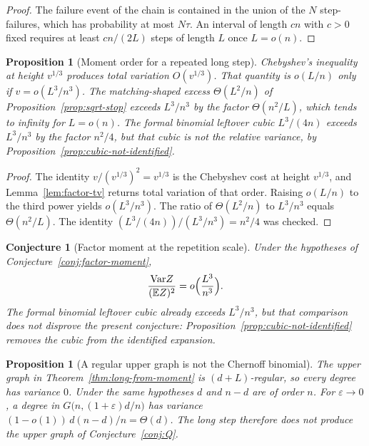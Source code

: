 \documentclass[11pt]{article}
\newtheorem{proposition}[theorem]{Proposition}
\newtheorem{conjecture}[theorem]{Conjecture}
\newcommand{\EE}{\mathbb{E}}
\newcommand{\Var}{\mathrm{Var}}
\begin{document}
\begin{proof}
The failure event of the chain is contained in the union of the \(N\) step-failures, which has probability at most \(N\tau\).
An interval of length \(cn\) with \(c>0\) fixed requires at least \(cn/(2L)\) steps of length \(L\) once \(L=o(n)\).
\end{proof}

\begin{proposition}[Moment order for a repeated long step]
\label{prop:chain-budget}
Chebyshev's inequality at height \(v^{1/3}\) produces total variation \(O(v^{1/3})\).
That quantity is \(o(L/n)\) only if \(v=o(L^3/n^3)\).
The matching-shaped excess \(\Theta(L^2/n)\) of Proposition~\ref{prop:sqrt-stop} exceeds \(L^3/n^3\) by the factor \(\Theta(n^2/L)\), which tends to infinity for \(L=o(n)\).
The formal binomial leftover cubic \(L^3/(4n)\) exceeds \(L^3/n^3\) by the factor \(n^2/4\), but that cubic is not the relative variance, by Proposition~\ref{prop:cubic-not-identified}.
\end{proposition}

\begin{proof}
The identity \(v/(v^{1/3})^2=v^{1/3}\) is the Chebyshev cost at height \(v^{1/3}\), and Lemma~\ref{lem:factor-tv} returns total variation of that order.
Raising \(o(L/n)\) to the third power yields \(o(L^3/n^3)\).
The ratio of \(\Theta(L^2/n)\) to \(L^3/n^3\) equals \(\Theta(n^2/L)\).
The identity \((L^3/(4n))/(L^3/n^3)=n^2/4\) was checked.
\end{proof}

\begin{conjecture}[Factor moment at the repetition scale]
\label{conj:factor-rate}
Under the hypotheses of Conjecture~\ref{conj:factor-moment},
\[
\frac{\Var Z}{(\EE Z)^2}=o\Bigl(\frac{L^3}{n^3}\Bigr).
\]
The formal binomial leftover cubic already exceeds \(L^3/n^3\), but that comparison does not disprove the present conjecture: Proposition~\ref{prop:cubic-not-identified} removes the cubic from the identified expansion.
\end{conjecture}

\begin{proposition}[A regular upper graph is not the Chernoff binomial]
\label{prop:not-binomial}
The upper graph in Theorem~\ref{thm:long-from-moment} is \((d+L)\)-regular, so every degree has variance \(0\).
Under the same hypotheses \(d\) and \(n-d\) are of order \(n\). For \(\varepsilon\to 0\), a degree in \(G\bigl(n,(1+\varepsilon)d/n\bigr)\) has variance \((1-o(1))\,d(n-d)/n=\Theta(d)\).
The long step therefore does not produce the upper graph of Conjecture~\ref{conj:Q}.
\end{proposition}
\end{document}

